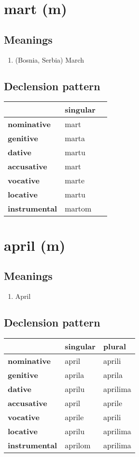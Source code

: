 \filbreak
\section{mart (m)}
\subsection*{Meanings}
\begin{enumerate}
\item (Bosnia, Serbia) March
\end{enumerate}
\subsection*{Declension pattern}
\begin{tabularx}{\linewidth}{Xll}
\toprule
{} & singular \\
\midrule
\textbf{nominative  } &     mart \\
\textbf{genitive    } &    marta \\
\textbf{dative      } &    martu \\
\textbf{accusative  } &     mart \\
\textbf{vocative    } &    marte \\
\textbf{locative    } &    martu \\
\textbf{instrumental} &   martom \\
\bottomrule
\end{tabularx}

\filbreak
\section{april (m)}
\subsection*{Meanings}
\begin{enumerate}
\item April
\end{enumerate}
\subsection*{Declension pattern}
\begin{tabularx}{\linewidth}{Xll}
\toprule
{} & singular &    plural \\
\midrule
\textbf{nominative  } &    april &    aprili \\
\textbf{genitive    } &   aprila &    aprila \\
\textbf{dative      } &   aprilu &  aprilima \\
\textbf{accusative  } &    april &    aprile \\
\textbf{vocative    } &   aprile &    aprili \\
\textbf{locative    } &   aprilu &  aprilima \\
\textbf{instrumental} &  aprilom &  aprilima \\
\bottomrule
\end{tabularx}

